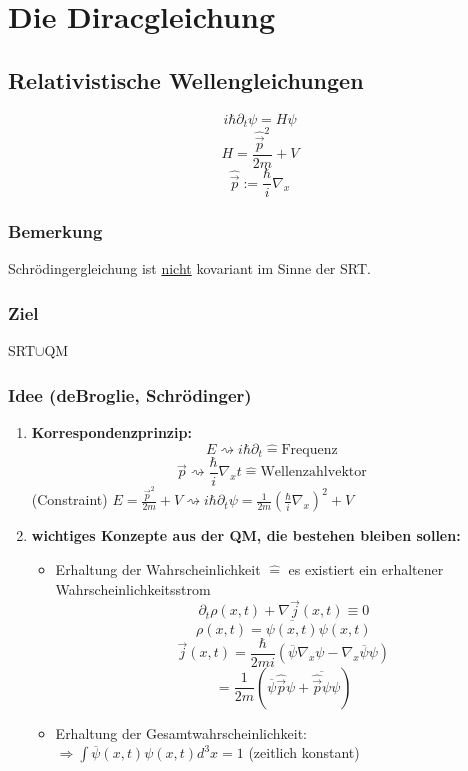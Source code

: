 \documentclass[twoside,a4paper]{scrartcl}
\renewcommand{\1}{\mathds{1}}
\newcommand{\Ra}{\Rightarrow}
\newcommand{\entspricht}{\mathrel{\widehat{=}}}
\begin{document}
\section{Die Diracgleichung}
\subsection{Relativistische Wellengleichungen}

$$i\hbar \partial_t \psi=H\psi$$
$$H=\frac{\hat{\vec p}^2}{2m}+V$$
$$\hat{\vec p}:=\frac{\hbar}{i}\nabla_x$$

\subsubsection*{Bemerkung}

Schrödingergleichung ist \underline{nicht} kovariant im Sinne der SRT.

\subsubsection*{Ziel}

SRT$\cup$QM

\subsubsection*{Idee (deBroglie, Schrödinger)}

\begin{enumerate}
\item \textbf{Korrespondenzprinzip:}
$$E \rightsquigarrow i\hbar \partial_t \entspricht \mathrm{Frequenz}$$
$$\vec p \rightsquigarrow \frac{\hbar}{i} \nabla_xt \entspricht\mathrm{Wellenzahlvektor}$$
(Constraint) $E=\frac{\vec p^2}{2m}+V \rightsquigarrow  i\hbar \partial_t \psi=\frac{1}{2m}(\frac{\hbar}{i}\nabla_x)^2+V$
\item \textbf{wichtiges Konzepte aus der QM, die bestehen bleiben sollen:}\\
\begin{itemize}
\item Erhaltung der Wahrscheinlichkeit $\entspricht$ es existiert ein erhaltener Wahrscheinlichkeitsstrom
$$\partial_t \rho(x,t)+\nabla \vec j(x,t)\equiv0$$
$$\rho(x,t)=\overline{\psi(x,t)} \psi(x,t)$$
$$\vec j(x,t)=\frac{\hbar}{2mi}(\overline{\psi}\nabla_x \psi-\nabla_x \overline{\psi}\psi)$$
$$=\frac{1}{2m}(\overline{\psi} \hat{\vec p} \psi+\overline{\hat{\vec p}\psi}\psi)$$
\item Erhaltung der Gesamtwahrscheinlichkeit:\\
$\Ra \int \overline{\psi}(x,t) \psi(x,t)d^3x=1$ (zeitlich konstant) 
\end{itemize}
\end{enumerate}
\end{document}
